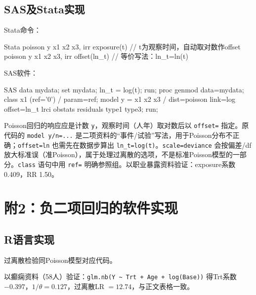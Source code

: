 \subsection{SAS及Stata实现}
Stata命令：
\par\noindent
\begin{coursecode}{Stata}
poisson y x1 x2 x3, irr exposure(t)      // t为观察时间，自动取对数作offset
poisson y x1 x2 x3, irr offset(ln_t)     // 等价写法：ln_t=ln(t)
\end{coursecode}
\par
{}
SAS软件：
\par\noindent
\begin{coursecode}{SAS}
data mydata; set mydata; ln_t = log(t); run;
proc genmod data=mydata;
  class x1 (ref='0') / param=ref;
  model y = x1 x2 x3 / dist=poisson link=log offset=ln_t
        lrci obstats residuals type1 type3;
run;
\end{coursecode}
\par
Poisson回归的响应应是计数 \texttt{y}，观察时间（人年）取对数后以 \texttt{offset=} 指定。原代码的 \texttt{model y/n=...} 是二项资料的“事件/试验”写法，用于Poisson分布不正确；\texttt{offset=ln} 也需先在数据步算出 \texttt{ln\_t=log(t)}。\texttt{scale=deviance} 会按偏差/df放大标准误（准Poisson），属于处理过离散的选项，不是标准Poisson模型的一部分。\texttt{class} 语句中用 \texttt{ref=} 明确参照组。以职业暴露资料验证：exposure系数0.409，RR 1.50。
\section{附2：负二项回归的软件实现}
\subsection{R语言实现}
过离散检验同Poisson模型对应代码。
\par\noindent\begin{minipage}{\linewidth}
以癫痫资料（58人）验证：\texttt{glm.nb(Y \textasciitilde{} Trt + Age + log(Base))} 得Trt系数 $-0.397$，$1/$，过离散LR $=12.74$，与正文表格一致。
\end{minipage}\par
